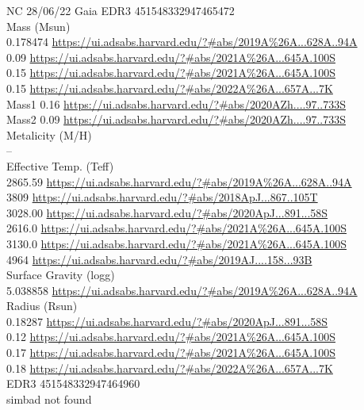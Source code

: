 NC 28/06/22
Gaia EDR3 451548332947465472\\
Mass (Msun)\\
0.178474 \url{https://ui.adsabs.harvard.edu/?#abs/2019A%26A...628A..94A}\\
0.09 \url{https://ui.adsabs.harvard.edu/?#abs/2021A%26A...645A.100S}\\
0.15 \url{https://ui.adsabs.harvard.edu/?#abs/2021A%26A...645A.100S}\\
0.15 \url{https://ui.adsabs.harvard.edu/?#abs/2022A%26A...657A...7K}\\
Mass1 0.16 \url{https://ui.adsabs.harvard.edu/?#abs/2020AZh....97..733S}\\
Mass2 0.09 \url{https://ui.adsabs.harvard.edu/?#abs/2020AZh....97..733S}\\
Metalicity (M/H)\\
--\\
Effective Temp. (Teff)\\
2865.59 \url{https://ui.adsabs.harvard.edu/?#abs/2019A%26A...628A..94A}\\
3809 \url{https://ui.adsabs.harvard.edu/?#abs/2018ApJ...867..105T}\\
3028.00 \url{https://ui.adsabs.harvard.edu/?#abs/2020ApJ...891...58S}\\
2616.0 \url{https://ui.adsabs.harvard.edu/?#abs/2021A%26A...645A.100S}\\
3130.0 \url{https://ui.adsabs.harvard.edu/?#abs/2021A%26A...645A.100S}\\
4964 \url{https://ui.adsabs.harvard.edu/?#abs/2019AJ....158...93B}\\
Surface Gravity (logg)\\
5.038858 \url{https://ui.adsabs.harvard.edu/?#abs/2019A%26A...628A..94A}\\
Radius (Rsun)\\
0.18287 \url{https://ui.adsabs.harvard.edu/?#abs/2020ApJ...891...58S}\\
0.12 \url{https://ui.adsabs.harvard.edu/?#abs/2021A%26A...645A.100S}\\
0.17 \url{https://ui.adsabs.harvard.edu/?#abs/2021A%26A...645A.100S}\\
0.18 \url{https://ui.adsabs.harvard.edu/?#abs/2022A%26A...657A...7K}\\

EDR3 451548332947464960\\
simbad not found \\